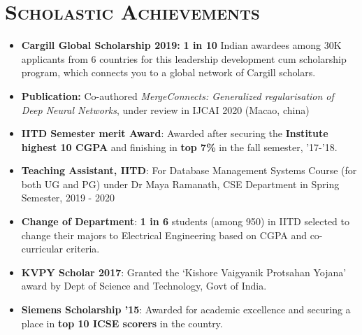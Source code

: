 \documentclass{article}
\newcommand{\tmpsection}[1]{}
\let\tmpsection=\section
\renewcommand{\section}[1]{\tmpsection*{\textsc{#1}}}
\begin{document}
\section{Scholastic Achievements}
\begin{itemize}
    \setlength\itemsep{0.0em}
    
    \item \textbf{Cargill Global Scholarship 2019:} \textbf{1 in 10} Indian awardees among 30K applicants from 6 countries for this leadership development cum scholarship program, which connects you to a global network of Cargill scholars.
    
    \item \textbf{Publication:} Co-authored \textit{MergeConnects: Generalized regularisation of Deep Neural Networks}, under review in IJCAI 2020 (Macao, china)
 
    \item \textbf{IITD Semester merit Award}: Awarded after securing the \textbf{Institute highest 10 CGPA} and finishing in \textbf{top 7\%} in the fall semester, '17-'18.
     
    \item \textbf{Teaching Assistant, IITD}: For Database Management Systems Course (for both UG and PG)  under Dr Maya Ramanath, CSE Department in Spring Semester, 2019 - 2020

    
    
   \item \textbf{Change of Department}: \textbf{1 in 6} students (among 950) in IITD selected to change their majors to Electrical Engineering based on CGPA and co-curricular criteria. 
   
    \item \textbf{KVPY Scholar 2017}: Granted the `Kishore Vaigyanik Protsahan Yojana' award by Dept of Science and Technology, Govt of India.

    \item \textbf{Siemens Scholarship '15}: Awarded for academic excellence and securing a place in \textbf{top 10 ICSE scorers} in the country.
    
   
    
    
\end{itemize}
\end{document}
